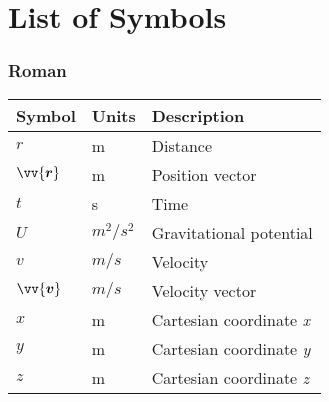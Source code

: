 \chapter*{List of Symbols}
\label{los}

\subsection*{Roman}
\begin{longtable}[l]{p{100pt} p{70pt} p{150pt}}
    \textbf{Symbol} & \textbf{Units} & \textbf{Description}                             \\
    \hline
    $r$              & m                & Distance                                      \\
    $\vv{\bm{r}}$    & m                & Position vector                               \\
    $t$              & s                & Time                                          \\
    $U$              & $m^2/s^2$        & Gravitational potential                       \\
    $v$              & $m/s$            & Velocity                                      \\
    $\vv{\bm{v}}$    & $m/s$            & Velocity vector                               \\
    $x$              & m                & Cartesian coordinate \emph{x}                 \\
    $y$              & m                & Cartesian coordinate \emph{y}                 \\
    $z$              & m                & Cartesian coordinate \emph{z}                 \\
\end{longtable}
\vspace{1cm}

